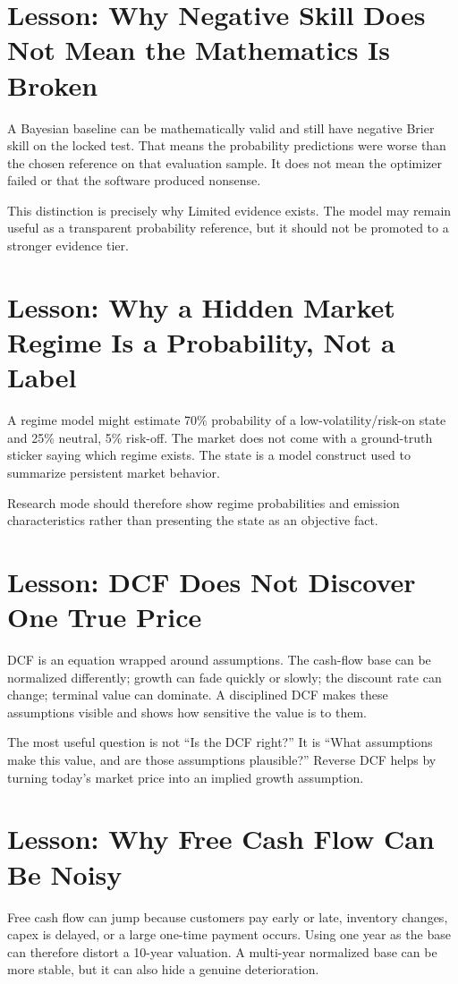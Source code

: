 \documentclass[11pt]{article}
\begin{document}
\section{Lesson: Why Negative Skill Does Not Mean the Mathematics Is Broken}
A Bayesian baseline can be mathematically valid and still have negative Brier skill on the locked test. That means the probability predictions were worse than the chosen reference on that evaluation sample. It does not mean the optimizer failed or that the software produced nonsense.

This distinction is precisely why Limited evidence exists. The model may remain useful as a transparent probability reference, but it should not be promoted to a stronger evidence tier.

\section{Lesson: Why a Hidden Market Regime Is a Probability, Not a Label}
A regime model might estimate 70\% probability of a low-volatility/risk-on state and 25\% neutral, 5\% risk-off. The market does not come with a ground-truth sticker saying which regime exists. The state is a model construct used to summarize persistent market behavior.

Research mode should therefore show regime probabilities and emission characteristics rather than presenting the state as an objective fact.

\section{Lesson: DCF Does Not Discover One True Price}
DCF is an equation wrapped around assumptions. The cash-flow base can be normalized differently; growth can fade quickly or slowly; the discount rate can change; terminal value can dominate. A disciplined DCF makes these assumptions visible and shows how sensitive the value is to them.

The most useful question is not ``Is the DCF right?'' It is ``What assumptions make this value, and are those assumptions plausible?'' Reverse DCF helps by turning today's market price into an implied growth assumption.

\section{Lesson: Why Free Cash Flow Can Be Noisy}
Free cash flow can jump because customers pay early or late, inventory changes, capex is delayed, or a large one-time payment occurs. Using one year as the base can therefore distort a 10-year valuation. A multi-year normalized base can be more stable, but it can also hide a genuine deterioration.
\end{document}
